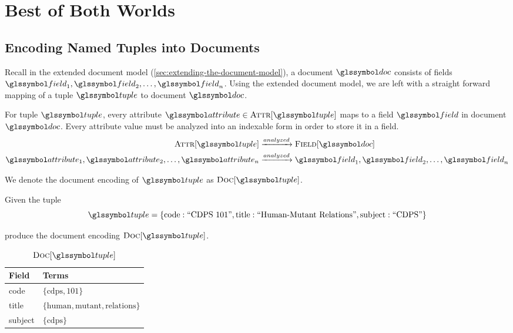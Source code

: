 \chapter{Best of Both Worlds}
	\section{Encoding Named Tuples into Documents}
	\label{sec:named-tuples-documents}
		Recall in the extended document model (\vref{sec:extending-the-document-model}), a document \(\doc\) consists of fields \(\field_1, \field_2, \dotsc, \field_n\).  Using the extended document model, we are left with a straight forward mapping of a tuple \(\tuple\) to document \(\doc\).
		
		For tuple \(\tuple\), every attribute \(\attribute \in \attributes{\tuple}\) maps to a field \(\field\) in document \(\doc\).	Every attribute value must be analyzed into an indexable form in order to store it in a field.
		\begin{align}
			\attributes{\tuple} &\xrightarrow{analyzed} \fields{\doc} \\
			\attribute_1, \attribute_2, \dotsc, \attribute_n &\xrightarrow{analyzed} \field_1, \field_2, \dotsc, \field_n
		\end{align}
		
		We denote the document encoding of \(\tuple\) as \(\docs{\tuple}\).
		
		\begin{ex}
			Given the tuple
			\[
				\tuple = \{\text{code}: \text{``CDPS 101''}, \text{title}: \text{``Human-Mutant Relations''}, \text{subject}: \text{``CDPS''}\}
			\]
			
			produce the document encoding \(\docs{\tuple}\).
			
			\begin{table}
				\centering
				
				\begin{tabular}{ll}
					\toprule
					Field & Terms \\
					\midrule
					code & \(\{\text{cdps}, \text{101}\}\) \\
					title & \(\{\text{human}, \text{mutant}, \text{relations}\}\) \\
					subject & \(\{\text{cdps}\}\) \\
					\bottomrule
				\end{tabular}
				
				\caption{\(\docs{\tuple}\)}
			\end{table}
		\end{ex}


